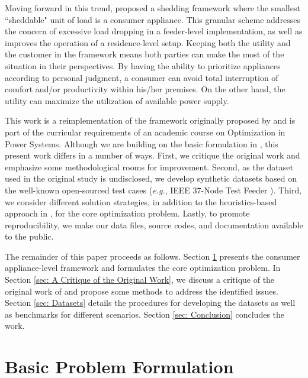\documentclass[journal, a4paper]{IEEEtran}
\begin{document}
Moving forward in this trend, \cite{Jabian2020} proposed a shedding framework where the smallest ``sheddable" unit of load is a consumer appliance.
This granular scheme addresses the concern of excessive load dropping in a feeder-level implementation,
as well as improves the operation of a residence-level setup.
Keeping both the utility and the customer in the framework means both parties can make the most of the situation in their perspectives.
By having the ability to prioritize appliances according to personal judgment, a consumer can avoid total interruption of comfort and/or productivity within his/her premises.
On the other hand, the utility can maximize the utilization of available power supply.

This work is a reimplementation of the framework originally proposed by \cite{Jabian2020}
and is part of the curricular requirements of an academic course on Optimization in Power Systems.
Although we are building on the basic formulation in \cite{Jabian2020},
this present work differs in a number of ways.
First, we critique the original work and emphasize some methodological rooms for improvement.
Second, as the dataset used in the original study is undisclosed,
we develop synthetic datasets based on the well-known open-sourced test cases
(\textit{e.g.}, IEEE 37-Node Test Feeder \cite{Kersting2001}).
Third, we consider different solution strategies,
in addition to the heuristics-based approach in \cite{Jabian2020},
for the core optimization problem.
Lastly, to promote reproducibility, we make our data files, source codes, and documentation available to the public.

The remainder of this paper proceeds as follows.
Section \ref{sec: Basic Problem Formulation} presents the consumer appliance-level framework
and formulates the core optimization problem.
In Section \ref{sec: A Critique of the Original Work}, we discuss a critique of the original work of \cite{Jabian2020}
and propose some methods to address the identified issues.
Section \ref{sec: Datasets} details the procedures for developing the datasets
as well as benchmarks for different scenarios.
Section \ref{sec: Conclusion} concludes the work.

\section{Basic Problem Formulation}
\label{sec: Basic Problem Formulation}
\end{document}
